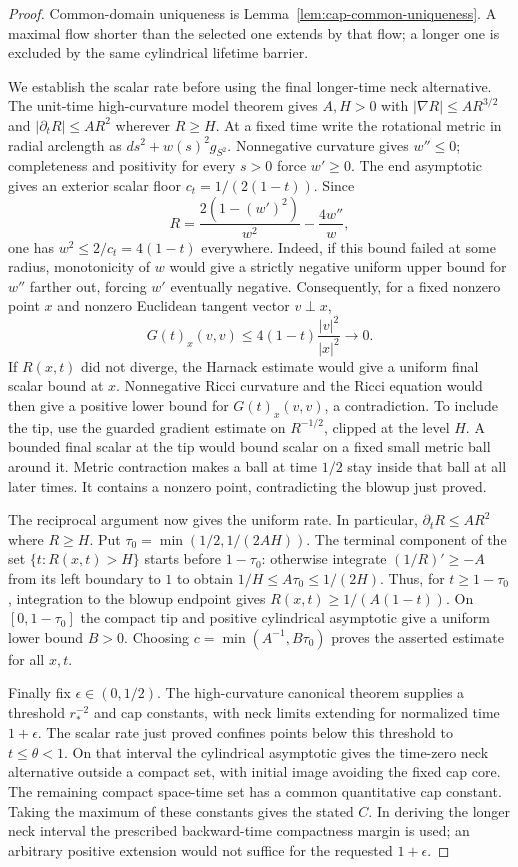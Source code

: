 \begin{proof}
Common-domain uniqueness is Lemma~\ref{lem:cap-common-uniqueness}.
A maximal flow shorter than
the selected one extends by that flow; a longer one is excluded by the
same cylindrical lifetime barrier.

We establish the scalar rate before using the final longer-time neck
alternative.  The unit-time high-curvature model theorem gives
$A,H>0$ with $|\nabla R|\leq AR^{3/2}$ and
$|\partial_tR|\leq AR^2$ wherever $R\geq H$.
At a fixed time write the rotational metric in radial arclength as
$ds^2+w(s)^2g_{S^2}$.  Nonnegative curvature gives $w''\leq0$;
completeness and positivity for every $s>0$ force $w'\geq0$.
The end asymptotic gives an exterior scalar floor
$c_t=1/(2(1-t))$.  Since
\[
 R=\frac{2(1-(w')^2)}{w^2}-\frac{4w''}{w},
\]
one has $w^2\leq2/c_t=4(1-t)$ everywhere.  Indeed, if this
bound failed at some radius, monotonicity of $w$ would give a
strictly negative uniform upper bound for $w''$ farther out, forcing
$w'$ eventually negative.  Consequently, for a fixed nonzero point
$x$ and nonzero Euclidean tangent vector $v\perp x$,
\[
 G(t)_x(v,v)\leq4(1-t)\frac{|v|^2}{|x|^2}\longrightarrow0.
\]
If $R(x,t)$ did not diverge, the Harnack estimate would give a
uniform final scalar bound at $x$.  Nonnegative Ricci curvature and
the Ricci equation would then give a positive lower bound for
$G(t)_x(v,v)$, a contradiction.  To include the tip, use the
guarded gradient estimate on $R^{-1/2}$, clipped at the level $H$.
A bounded final scalar at the tip would bound scalar on a fixed small
metric ball around it.  Metric contraction makes a ball at time
$1/2$ stay inside that ball at all later times.  It contains a
nonzero point, contradicting the blowup just proved.

The reciprocal argument now gives the uniform rate.  In particular,
$\partial_tR\leq AR^2$ where $R\geq H$.
Put $\tau_0=\min(1/2,1/(2AH))$.  The terminal component of the set
$\{t:R(x,t)>H\}$ starts before $1-\tau_0$: otherwise integrate
$(1/R)'\geq-A$ from its left boundary to $1$ to obtain
$1/H\leq A\tau_0\leq1/(2H)$.
Thus, for $t\geq1-\tau_0$, integration to the blowup endpoint gives
$R(x,t)\geq1/(A(1-t))$.
On $[0,1-\tau_0]$ the compact tip and positive cylindrical asymptotic
give a uniform lower bound $B>0$.  Choosing
$c=\min(A^{-1},B\tau_0)$ proves the asserted estimate for all $x,t$.

Finally fix $\epsilon\in(0,1/2)$.  The high-curvature canonical
theorem supplies a threshold $r_*^{-2}$ and cap constants, with
neck limits extending for normalized time $1+\epsilon$.
The scalar rate just proved confines points below this threshold
to $t\leq\theta<1$.  On that interval the cylindrical asymptotic
gives the time-zero neck alternative outside a compact set, with
initial image avoiding the fixed cap core.  The remaining compact
space-time set has a common quantitative cap constant.  Taking the
maximum of these constants gives the stated $C$.
In deriving the longer neck interval the prescribed backward-time
compactness margin is used; an arbitrary positive extension would
not suffice for the requested $1+\epsilon$.
\end{proof}

